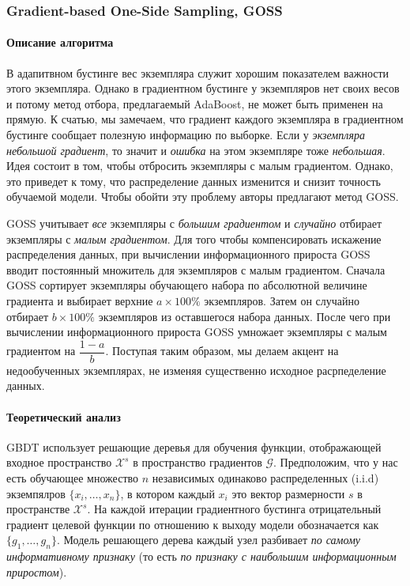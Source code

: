 \documentclass[%
	11pt,
	a4paper,
	utf8,
		]{article}
\begin{document}
\subsubsection{Gradient-based One-Side Sampling, GOSS}

\paragraph{Описание алгоритма} В адапитвном бустинге вес экземпляра служит хорошим показателем важности этого экземпляра. Однако в градиентном бустинге у экземпляров нет своих весов и потому метод отбора, предлагаемый AdaBoost, не может быть применен на прямую. К счатью, мы замечаем, что градиент каждого экземпляра в градиентном бустинге сообщает полезную информацию по выборке. Если у \emph{экземпляра небольшой градиент}, то значит и \emph{ошибка} на этом экземпляре тоже \emph{небольшая}. Идея состоит в том, чтобы отбросить экземпляры с малым градиентом. Однако, это приведет к тому, что распределение данных изменится и снизит точность обучаемой модели. Чтобы обойти эту проблему авторы предлагают метод GOSS.

{\color{blue}GOSS учитывает \emph{все} экземпляры с \emph{большим градиентом} и \emph{случайно} отбирает экземпляры с \emph{малым градиентом}.} Для того чтобы компенсировать искажение распределения данных, при вычислении информационного прироста GOSS вводит постоянный множитель для экземпляров с малым градиентом. Сначала GOSS сортирует экземпляры обучающего набора по абсолютной величине градиента и выбирает верхние $ a \times 100 \% $ экземпляров. Затем он случайно отбирает $ b \times 100\% $ экземпляров из оставшегося набора данных. После чего при вычислении информационного прироста GOSS умножает экземпляры с малым градиентом на $ \dfrac{1 - a}{b} $. Поступая таким образом, мы делаем акцент на недообученных экземплярах, не изменяя существенно исходное расрпеделение данных.

\paragraph{Теоретический анализ} GBDT использует решающие деревья для обучения функции, отображающей входное пространство $ \mathcal{X}^s $ в пространство градиентов $ \mathcal{G} $. Предположим, что у нас есть обучающее множество $ n $ независимых одинаково распределенных (i.i.d) экземпялров $ \{x_i, \ldots, x_n\} $, в котором каждый $ x_i $ это вектор размерности $ s $ в пространстве $ \mathcal{X}^s $. На каждой итерации градиентного бустинга отрицательный градиент целевой функции по отношению к выходу модели обозначается как $ \{g_1, \ldots, g_n\} $. Модель решающего дерева каждый узел разбивает \emph{по самому информативному признаку} (то есть \emph{по признаку с наибольшим информационным приростом}).
\end{document}
